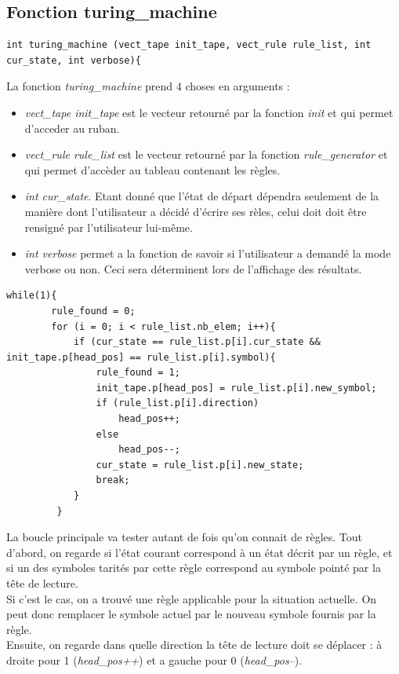 \documentclass[12pt,a4paper]{report}
\begin{document}
\subsection{Fonction turing\_machine}
\begin{verbatim}
int turing_machine (vect_tape init_tape, vect_rule rule_list, int cur_state, int verbose){
\end{verbatim}
La fonction \textit{turing\_machine} prend 4 choses en arguments :
\begin{itemize}
\item \textit{vect\_tape init\_tape} est le vecteur retourné par la fonction \textit{init} et qui permet d'acceder au ruban.
\item \textit{vect\_rule rule\_list} est le vecteur retourné par la fonction \textit{rule\_generator} et qui permet d'accèder au tableau contenant les règles.
\item \textit{int cur\_state}. Etant donné que l'état de départ dépendra seulement de la manière dont l'utilisateur a décidé d'écrire ses rèles, celui doit doit être rensigné par l'utilisateur lui-même.
\item \textit{int verbose} permet a la fonction de savoir si l'utilisateur a demandé la mode verbose ou non. Ceci sera déterminent lors de l'affichage des résultats.
\end{itemize}
\begin{lstlisting}
while(1){
        rule_found = 0;
        for (i = 0; i < rule_list.nb_elem; i++){
            if (cur_state == rule_list.p[i].cur_state && init_tape.p[head_pos] == rule_list.p[i].symbol){
                rule_found = 1;
                init_tape.p[head_pos] = rule_list.p[i].new_symbol;
                if (rule_list.p[i].direction)
                    head_pos++;
                else
                    head_pos--;
                cur_state = rule_list.p[i].new_state;
                break;
            }
         }
\end{lstlisting}
La boucle principale va tester autant de fois qu'on connait de règles. Tout d'abord, on regarde si l'état courant correspond à un état décrit par un règle, et si un des symboles tarités par cette règle correspond au symbole pointé par la tête de lecture.\\
Si c'est le cas, on a trouvé une règle applicable pour la situation actuelle. On peut donc remplacer le symbole actuel par le nouveau symbole fournis par la règle. \\
Ensuite, on regarde dans quelle direction la tête de lecture doit se déplacer : à droite pour 1 (\textit{head\_pos++}) et a gauche pour 0 (\textit{head\_pos--}).\\
\end{document}

